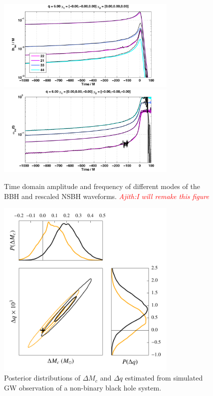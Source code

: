 \documentclass[prd,preprintnumbers,twocolumn,eqsecnum,floatfix,a4paper,nofootinbib,superscriptaddress]{revtex4}
\newcommand{\ajith}[1]{\textcolor{red}{\textit{Ajith:#1}}}
\begin{document}
\begin{figure}[htb] 
\begin{center}
\includegraphics[width=3.4in]{figs/BBH_NSBH_q6_amp.pdf}
\includegraphics[width=3.4in]{figs/BBH_NSBH_q6_freq.pdf}
\end{center} 
\caption{Time domain amplitude and frequency of different modes of the BBH and rescaled NSBH waveforms. \ajith{I will remake this figure}}
\label{fig:bbh_nsbh_waveforms}
\end{figure}


\begin{figure}[htb] 
\begin{center}
\includegraphics[width=3.4in]{figs/posteriors_BBH_rescaled_NSBH.pdf}
\end{center} 
\caption{Posterior distributions of $\Delta M_c$ and $\Delta q$ estimated from simulated GW observation of a non-binary black hole system.} 
\label{fig:non_bbh_posterior}
\end{figure}
\end{document}
